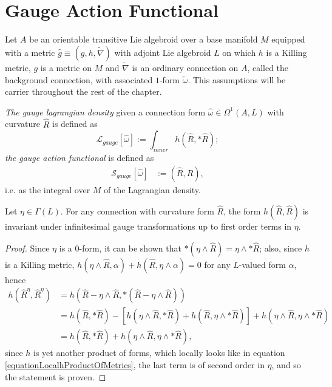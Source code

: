 \section{Gauge Action Functional}
\label{chGaugeSectionGaugeAction}

Let $A$ be an orientable transitive Lie algebroid over a base manifold $M$ equipped with a metric $\hat g \equiv (g, h, \tilde \nabla)$ with adjoint Lie algebroid $L$ on which $h$ is a Killing metric, $g$ is a metric on $M$ and $\tilde \nabla$ is an ordinary connection on $A$, called the background connection, with associated $1$-form $\tilde \omega$. This assumptions will be carrier throughout the rest of the chapter.

\begin{definition}\label{definitionGaugeActionLagrangian}
\emph{The gauge lagrangian density} given a connection form $\hat \omega \in \Omega^1(A, L)$ with curvature $\hat R$ is defined as
\begin{equation}
    \mathcal L_{gauge}[\hat \omega] := \int_{inner} h(\hat R, *\hat R);
\end{equation}
\emph{the gauge action functional} is defined as 
\begin{align}
    \mathcal S_{gauge}[\hat \omega]& := (\hat R, \hat R),
\end{align}
i.e. as the integral over $M$ of the Lagrangian density.
\end{definition}

\begin{lemma}\label{lemmaIntegrationFOrmGaugeActionTHeoryhRRisInvariantGaugeTransforamtions}
Let $\eta \in \Gamma(L)$. For any connection with curvature form $\hat R$, the form $h(\hat R, \hat R)$ is invariant under infinitesimal gauge transformations up to first order terms in $\eta$.
\end{lemma}
\begin{proof}
Since $\eta$ is a $0$-form, it can be shown that $*(\eta \wedge \hat R) = \eta \wedge *\hat R$; also, since $h$ is a Killing metric, $h(\eta \wedge \hat R, \alpha) + h(\hat R, \eta \wedge \alpha) = 0$ for any $L$-valued form $\alpha$, hence
\begin{align*}
    h(\hat R^\eta, \hat R^\eta) 
        &=h( \hat R - \eta \wedge \hat R, *(\hat R - \eta \wedge \hat R)) \\
        &= h(\hat R, *\hat R) - [h(\eta \wedge \hat R, *\hat R) + h(\hat R, \eta \wedge *\hat R)] + h(\eta \wedge \hat R, \eta \wedge *\hat R)\\
        &= h(\hat R, *\hat R) + h(\eta \wedge \hat R, \eta \wedge *\hat R),
\end{align*}
since $h$ is yet another product of forms, which locally looks like in equation \eqref{equationLocalhProductOfMetrics}, the last term is of second order in $\eta$, and so the statement is proven.
\end{proof}

